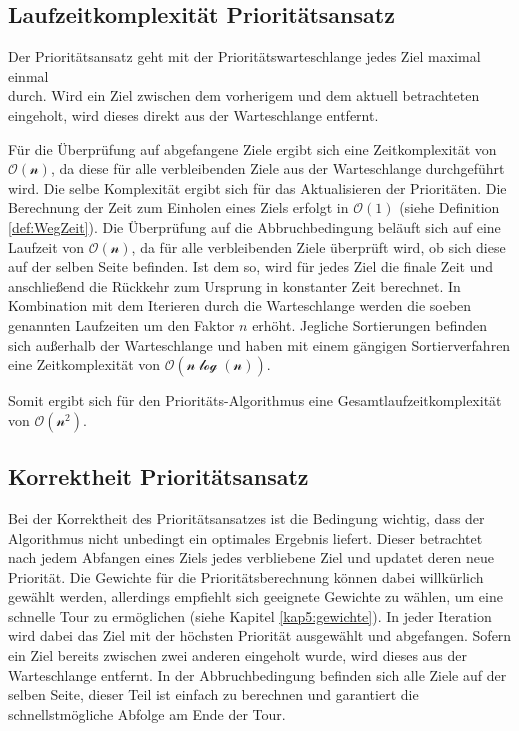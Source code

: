 \documentclass[german,version-2019-11]{uzl-thesis}
\begin{document}
\subsection{Laufzeitkomplexität Prioritätsansatz}

Der Prioritätsansatz geht mit der Prioritätswarteschlange jedes Ziel maximal einmal \\durch. Wird ein Ziel zwischen dem vorherigem und dem aktuell betrachteten eingeholt, wird dieses direkt aus der Warteschlange entfernt. 

Für die Überprüfung auf abgefangene Ziele ergibt sich eine Zeitkomplexität von $\mathcal{O(n)}$, da diese für alle verbleibenden Ziele aus der Warteschlange durchgeführt wird. Die selbe Komplexität ergibt sich für das Aktualisieren der Prioritäten. Die Berechnung der Zeit zum Einholen eines Ziels erfolgt in $\mathcal{O(1)}$ (siehe Definition \ref{def:WegZeit}). Die Überprüfung auf die Abbruchbedingung beläuft sich auf eine Laufzeit von $\mathcal{O(n)}$, da für alle verbleibenden Ziele überprüft wird, ob sich diese auf der selben Seite befinden. Ist dem so, wird für jedes Ziel die finale Zeit und anschließend die Rückkehr zum Ursprung in konstanter Zeit berechnet. In Kombination mit dem Iterieren durch die Warteschlange werden die soeben genannten Laufzeiten um den Faktor $n$ erhöht. Jegliche Sortierungen befinden sich außerhalb der Warteschlange und haben mit einem gängigen Sortierverfahren \cite{kaaser2014algorithmen} eine Zeitkomplexität von $\mathcal{O(n\log(n))}$. 

Somit ergibt sich für den Prioritäts-Algorithmus eine Gesamtlaufzeitkomplexität von $\mathcal{O(n^2)}$.

\subsection{Korrektheit Prioritätsansatz}
Bei der Korrektheit des Prioritätsansatzes ist die Bedingung wichtig, dass der Algorithmus nicht unbedingt ein optimales Ergebnis liefert. Dieser betrachtet nach jedem Abfangen eines Ziels jedes verbliebene Ziel und updatet deren neue Priorität. Die Gewichte für die Prioritätsberechnung können dabei willkürlich gewählt werden, allerdings empfiehlt sich geeignete Gewichte zu wählen, um eine schnelle Tour zu ermöglichen (siehe Kapitel \ref{kap5:gewichte}). In jeder Iteration wird dabei das Ziel mit der höchsten Priorität ausgewählt und abgefangen. Sofern ein Ziel bereits zwischen zwei anderen eingeholt wurde, wird dieses aus der Warteschlange entfernt. In der Abbruchbedingung befinden sich alle Ziele auf der selben Seite, dieser Teil ist einfach zu berechnen und garantiert die schnellstmögliche Abfolge am Ende der Tour. 
\end{document}
